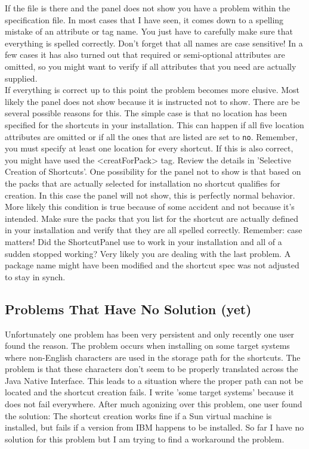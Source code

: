 If the file is there and the panel does not show you have a problem
within the specification file. In most cases that I have seen, it comes
down to a spelling mistake of an attribute or tag name. You just have to
carefully make sure that everything is spelled correctly. Don't forget
that all names are case sensitive! In a few cases it has also turned out
that required or semi-optional attributes are omitted, so you might want
to verify if all attributes that you need are actually supplied.\\

If everything is correct up to this point the problem becomes more
elusive.  Most likely the panel does not show because it is instructed
not to show. There are be several possible reasons for this. The simple
case is that no location has been specified for the shortcuts in your
installation. This can happen if all five location attributes are
omitted or if all the ones that are listed are set to \texttt{no}.
Remember, you must specify at least one location for every shortcut. If
this is also correct, you might have used the <creatForPack> tag. Review
the details in 'Selective Creation of Shortcuts'. One possibility for
the panel not to show is that based on the packs that are actually
selected for installation no shortcut qualifies for creation. In this
case the panel will not show, this is perfectly normal behavior. More
likely this condition is true because of some accident and not because
it's intended. Make sure the packs that you list for the shortcut are
actually defined in your installation and verify that they are all
spelled correctly. Remember: case matters! Did the ShortcutPanel use to
work in your installation and all of a sudden stopped working? Very
likely you are dealing with the last problem. A package name might have
been modified and the shortcut spec was not adjusted to stay in synch.\\

\subsection{Problems That Have No Solution (yet)}

Unfortunately one problem has been very persistent and only recently one
user found the reason. The problem occurs when installing on some target
systems where non-English characters are used in the storage path for
the shortcuts. The problem is that these characters don't seem to be
properly translated across the Java Native Interface. This leads to a
situation where the proper path can not be located and the shortcut
creation fails. I write 'some target systems' because it does not fail
everywhere. After much agonizing over this problem, one user found the
solution: The shortcut creation works fine if a Sun virtual machine is
installed, but fails if a version from IBM happens to be installed. So
far I have no solution for this problem but I am trying to find a
workaround the problem.\\
